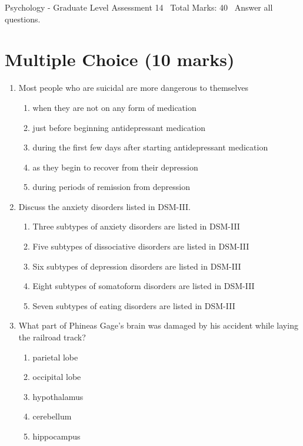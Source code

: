 \documentclass[12pt]{article}
\begin{document}
\begin{center}
Psychology - Graduate Level Assessment 14 \
Total Marks: 40 \
Answer all questions.
\end{center}

\section*{Multiple Choice (10 marks)}
\begin{enumerate}[label=\arabic*.]
\item Most people who are suicidal are more dangerous to themselves
\begin{enumerate}[label=(\alph*)]
    \item when they are not on any form of medication
    \item just before beginning antidepressant medication
    \item during the first few days after starting antidepressant medication
    \item as they begin to recover from their depression
    \item during periods of remission from depression
\end{enumerate}
\item Discuss the anxiety disorders listed in DSM-III.
\begin{enumerate}[label=(\alph*)]
    \item Three subtypes of anxiety disorders are listed in DSM-III
    \item Five subtypes of dissociative disorders are listed in DSM-III
    \item Six subtypes of depression disorders are listed in DSM-III
    \item Eight subtypes of somatoform disorders are listed in DSM-III
    \item Seven subtypes of eating disorders are listed in DSM-III
\end{enumerate}
\item What part of Phineas Gage's brain was damaged by his accident while laying the railroad track?
\begin{enumerate}[label=(\alph*)]
    \item parietal lobe
    \item occipital lobe
    \item hypothalamus
    \item cerebellum
    \item hippocampus
\end{enumerate}

\end{enumerate}
\end{document}
